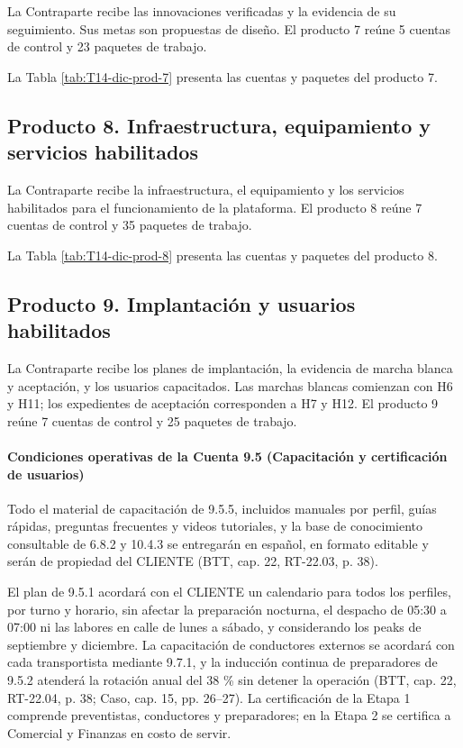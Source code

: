 La Contraparte recibe las innovaciones verificadas y la evidencia de su seguimiento. Sus metas son propuestas de diseño.
El producto 7 reúne 5 cuentas de control y 23 paquetes de trabajo.

La Tabla \ref{tab:T14-dic-prod-7} presenta las cuentas y paquetes del producto 7.

\subsection{Producto 8. Infraestructura, equipamiento y servicios habilitados}

La Contraparte recibe la infraestructura, el equipamiento y los servicios habilitados para el funcionamiento de la plataforma.
El producto 8 reúne 7 cuentas de control y 35 paquetes de trabajo.

La Tabla \ref{tab:T14-dic-prod-8} presenta las cuentas y paquetes del producto 8.

\subsection{Producto 9. Implantación y usuarios habilitados}

La Contraparte recibe los planes de implantación, la evidencia de marcha blanca y aceptación, y los usuarios capacitados. Las marchas blancas comienzan con H6 y H11; los expedientes de aceptación corresponden a H7 y H12.
El producto 9 reúne 7 cuentas de control y 25 paquetes de trabajo.

\paragraph{Condiciones operativas de la Cuenta 9.5 (Capacitación y certificación de usuarios)}
Todo el material de capacitación de 9.5.5, incluidos manuales por perfil, guías rápidas, preguntas frecuentes y videos tutoriales, y la base de conocimiento consultable de 6.8.2 y 10.4.3 se entregarán en español, en formato editable y serán de propiedad del CLIENTE (BTT, cap. 22, RT-22.03, p. 38).

El plan de 9.5.1 acordará con el CLIENTE un calendario para todos los perfiles, por turno y horario, sin afectar la preparación nocturna, el despacho de 05:30 a 07:00 ni las labores en calle de lunes a sábado, y considerando los peaks de septiembre y diciembre. La capacitación de conductores externos se acordará con cada transportista mediante 9.7.1, y la inducción continua de preparadores de 9.5.2 atenderá la rotación anual del 38 \% sin detener la operación (BTT, cap. 22, RT-22.04, p. 38; Caso, cap. 15, pp. 26--27). La certificación de la Etapa 1 comprende preventistas, conductores y preparadores; en la Etapa 2 se certifica a Comercial y Finanzas en costo de servir.

